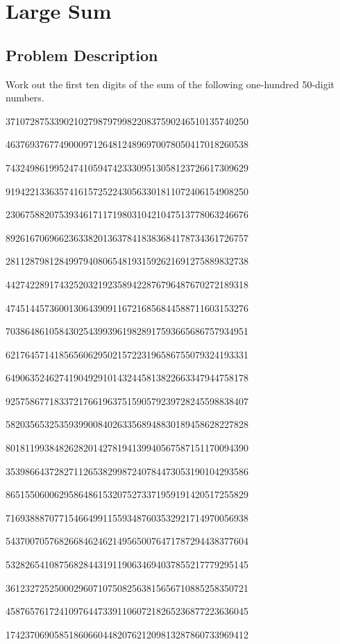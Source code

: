 \chapter{Large Sum}
\section{Problem Description}
Work out the first ten digits of the sum of the following one-hundred 50-digit numbers.
\begin{center}
37107287533902102798797998220837590246510135740250

46376937677490009712648124896970078050417018260538

74324986199524741059474233309513058123726617309629

91942213363574161572522430563301811072406154908250

23067588207539346171171980310421047513778063246676

89261670696623633820136378418383684178734361726757

28112879812849979408065481931592621691275889832738

44274228917432520321923589422876796487670272189318

47451445736001306439091167216856844588711603153276

70386486105843025439939619828917593665686757934951

62176457141856560629502157223196586755079324193331

64906352462741904929101432445813822663347944758178

92575867718337217661963751590579239728245598838407

58203565325359399008402633568948830189458628227828

80181199384826282014278194139940567587151170094390

35398664372827112653829987240784473053190104293586

86515506006295864861532075273371959191420517255829

71693888707715466499115593487603532921714970056938

54370070576826684624621495650076471787294438377604

53282654108756828443191190634694037855217779295145

36123272525000296071075082563815656710885258350721

45876576172410976447339110607218265236877223636045

17423706905851860660448207621209813287860733969412


\end{center}
